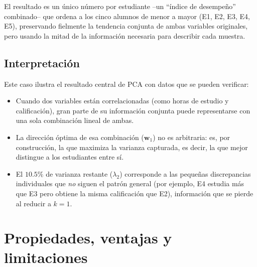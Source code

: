 \documentclass[11pt,letterpaper]{article}
\begin{document}
	El resultado es un único número por estudiante --un ``índice de desempeño'' combinado-- que ordena a los cinco alumnos de menor a mayor (E1, E2, E3, E4, E5), preservando fielmente la tendencia conjunta de ambas variables originales, pero usando la mitad de la información necesaria para describir cada muestra.
	
	\subsection{Interpretación}
	
	Este caso ilustra el resultado central de PCA con datos que se pueden verificar:
	\begin{itemize}[itemsep=2pt]
		\item Cuando dos variables están correlacionadas (como horas de estudio y calificación), gran parte de su información conjunta puede representarse con una sola combinación lineal de ambas.
		\item La dirección óptima de esa combinación ($\mathbf{w}_1$) no es arbitraria: es, por construcción, la que maximiza la varianza capturada, es decir, la que mejor distingue a los estudiantes entre sí.
		\item El $10.5\%$ de varianza restante ($\lambda_2$) corresponde a las pequeñas discrepancias individuales que \emph{no} siguen el patrón general (por ejemplo, E4 estudia más que E3 pero obtiene la misma calificación que E2), información que se pierde al reducir a $k=1$.
	\end{itemize}
	
	\newpage
	
	\section{Propiedades, ventajas y limitaciones}
	
\end{document}
